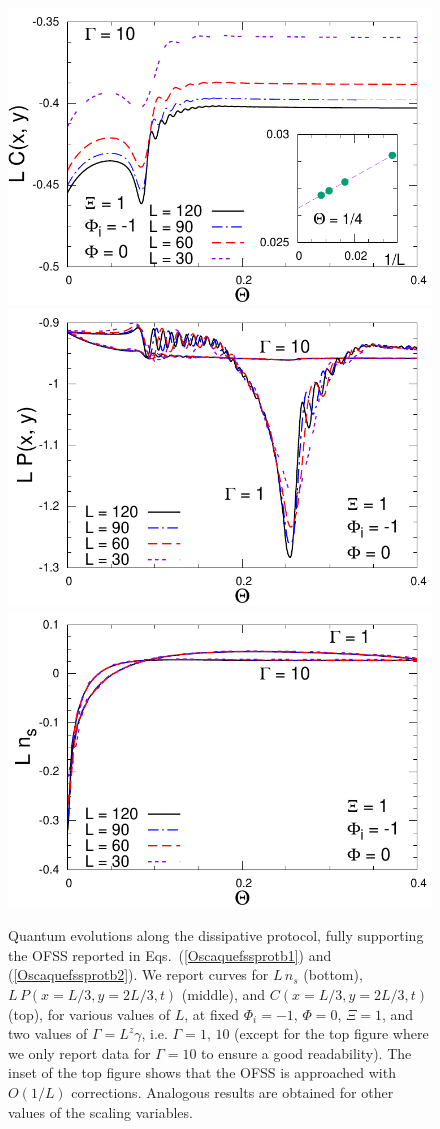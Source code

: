\begin{figure}[!htb]
    \centering
      \includegraphics[width=0.45\columnwidth]{imm/LCk-1q0e100t100S10000.pdf}
      \includegraphics[width=0.45\columnwidth]{imm/LPk-1q0e100t100S10000.pdf}
        \includegraphics[width=0.45\columnwidth]{imm/LNk-1q0e100t100S10000.pdf}
        \caption{Quantum evolutions along the dissipative protocol, fully
          supporting the OFSS reported in Eqs.~(\ref{Oscaquefssprotb1})
          and (\ref{Oscaquefssprotb2}). We report curves for $L\,n_s$
          (bottom), $L\,P(x=L/3,y=2L/3,t)$ (middle), and
          $C(x=L/3,y=2L/3,t)$ (top), for various values of $L$, at fixed
          $\Phi_i=-1$, $\Phi=0$, $\Xi=1$, and two values of
          $\Gamma=L^z\gamma$, i.e.  $\Gamma=1,\,10$ (except for the top
          figure where we only report data for $\Gamma=10$ to ensure a
          good readability).  The inset of the top figure shows that the
          OFSS is approached with $O(1/L)$ corrections. Analogous results
          are obtained for other values of the scaling variables. }
      \label{protbresgammaresc}
\end{figure}

